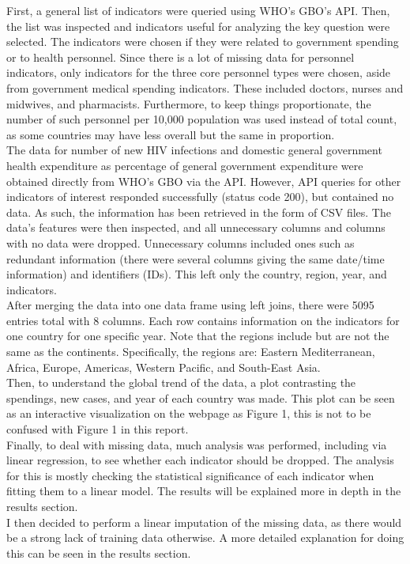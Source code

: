 \documentclass[
  letterpaper,
  DIV=11,
  numbers=noendperiod]{scrartcl}
\begin{document}
First, a general list of indicators were queried using WHO's GBO's API.
Then, the list was inspected and indicators useful for analyzing the key
question were selected. The indicators were chosen if they were related
to government spending or to health personnel. Since there is a lot of
missing data for personnel indicators, only indicators for the three
core personnel types were chosen, aside from government medical spending
indicators. These included doctors, nurses and midwives, and
pharmacists. Furthermore, to keep things proportionate, the number of
such personnel per 10,000 population was used instead of total count, as
some countries may have less overall but the same in proportion. \\
The data for number of new HIV infections and domestic general government
health expenditure as percentage of general government expenditure were
obtained directly from WHO's GBO via the API. However, API queries for
other indicators of interest responded successfully (status code 200),
but contained no data. As such, the information has been retrieved in
the form of CSV files. The data's features were then inspected, and all
unnecessary columns and columns with no data were dropped. Unnecessary
columns included ones such as redundant information (there were several
columns giving the same date/time information) and identifiers (IDs).
This left only the country, region, year, and indicators. \\
After merging
the data into one data frame using left joins, there were 5095 entries
total with 8 columns. Each row contains information on the indicators
for one country for one specific year. Note that the regions include but
are not the same as the continents. Specifically, the regions are:
Eastern Mediterranean, Africa, Europe, Americas, Western Pacific, and
South-East Asia. \\
Then, to understand the global trend of the data, a
plot contrasting the spendings, new cases, and year of each country was
made. This plot can be seen as an interactive visualization on the
webpage as Figure 1, this is not to be confused with Figure 1 in this
report. \\
Finally, to deal with missing data, much analysis was performed,
including via linear regression, to see whether each indicator should be
dropped. The analysis for this is mostly checking the statistical significance of
each indicator when fitting them to a linear model. The results will be
explained more in depth in the results section. \\
I then decided to
perform a linear imputation of the missing data, as there would be a
strong lack of training data otherwise. A more detailed explanation for
doing this can be seen in the results section.
\end{document}
